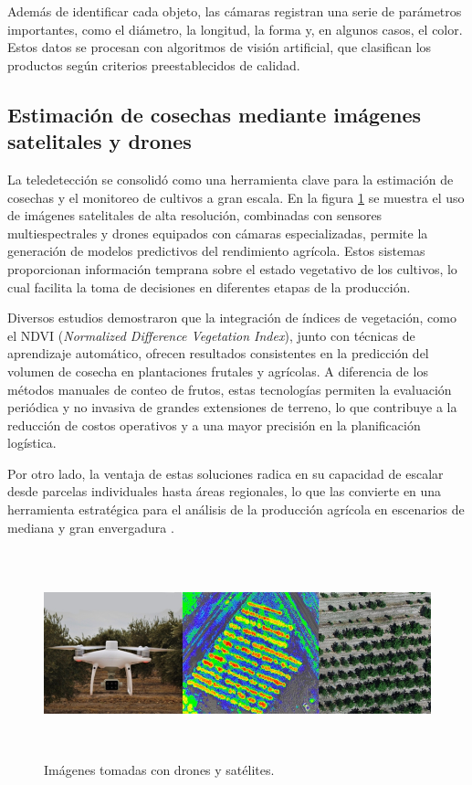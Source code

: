 
Además de identificar cada objeto, las cámaras registran una serie de parámetros importantes, como el diámetro, la longitud, la forma y, en algunos casos, el color. Estos datos se procesan con algoritmos de visión artificial, que clasifican los productos según criterios preestablecidos de calidad.

\subsection{Estimación de cosechas mediante imágenes satelitales y drones}

La teledetección se consolidó como una herramienta clave para la estimación de cosechas y el monitoreo de cultivos a gran escala. En la figura \ref{fig:drones_en_cultivos} se muestra el uso de imágenes satelitales de alta resolución, combinadas con sensores multiespectrales y drones equipados con cámaras especializadas, permite la generación de modelos predictivos del rendimiento agrícola. Estos sistemas proporcionan información temprana sobre el estado vegetativo de los cultivos, lo cual facilita la toma de decisiones en diferentes etapas de la producción.

Diversos estudios demostraron que la integración de índices de vegetación, como el NDVI (\textit{Normalized Difference Vegetation Index}), junto con técnicas de aprendizaje automático, ofrecen resultados consistentes en la predicción del volumen de cosecha en plantaciones frutales y agrícolas. A diferencia de los métodos manuales de conteo de frutos, estas tecnologías permiten la evaluación periódica y no invasiva de grandes extensiones de terreno, lo que contribuye a la reducción de costos operativos y a una mayor precisión en la planificación logística.

Por otro lado, la ventaja de estas soluciones radica en su capacidad de escalar desde parcelas individuales hasta áreas regionales, lo que las convierte en una herramienta estratégica para el análisis de la producción agrícola en escenarios de mediana y gran envergadura \citep{Hobart2025}.

\vspace{1cm}
\begin{figure}[htbp]
	\centering
	\includegraphics[width=1\textwidth, height=6cm]{./Figures/drones_en_cultivos.jpg}
	\caption{Imágenes tomadas con drones y satélites\protect\footnotemark.}
	\label{fig:drones_en_cultivos}
\end{figure}
\vspace{1cm}

